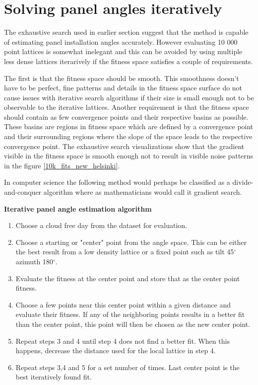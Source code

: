 \newpage

\section{Solving panel angles iteratively}
The exhaustive search used in earlier section suggest that the method is capable of estimating panel installation angles accurately. However evaluating 10 000 point lattices is somewhat inelegant and this can be avoided by using multiple less dense lattices iterarively if the fitness space satisfies a couple of requirements.

The first is that the fitness space should be smooth. This smoothness doesn't have to be perfect, fine patterns and details in the fitness space surface do not cause issues with iterative search algorithms if their size is small enough not to be observable to the iterative lattices. Another requirement is that the fitness space should contain as few convergence points and their respective basins as possible. These basins are regions in fitness space which are defined by a convergence point and their surrounding regions where the slope of the space leads to the respective convergence point. The exhaustive search visualizations show that the gradient visible in the fitness space is smooth enough not to result in visible noise patterns in the figure \ref{10k_fits_new_helsinki}. %


In computer science the following method would perhaps be classified as a divide-and-conquer algorithm where as mathematicians would call it gradient search.



 

\noindent \textbf{Iterative panel angle estimation algorithm}
\begin{enumerate}
	\item Choose a cloud free day from the dataset for evaluation.
  \item Choose a starting or "center" point from the angle space. This can be either the best result from a low density lattice or a fixed point such as tilt 45$^\circ$ azimuth 180$^\circ$.
  \item Evaluate the fitness at the center point and store that as the center point fitness.
  \item Choose a few points near this center point within a given distance and evaluate their fitness. If any of the neighboring points results in a better fit than the center point, this point will then be chosen as the new center point.
  \item Repeat steps 3 and 4 until step 4 does not find a better fit. When this happens, decrease the distance used for the local lattice in step 4.
  \item Repeat steps 3,4 and 5 for a set number of times. Last center point is the best iteratively found fit.
\end{enumerate}



